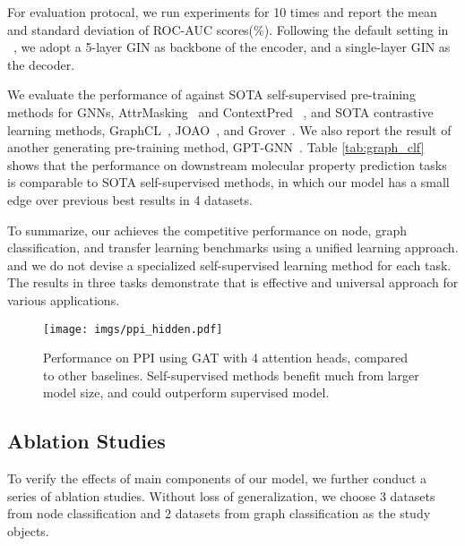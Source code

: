 {For evaluation protocal,  we run experiments for 10 times and report the mean and standard deviation of ROC-AUC scores(\%). Following the default setting in ~\cite{hu2020strategies},  we adopt a 5-layer GIN as backbone of the encoder, and a single-layer GIN as the decoder.


We evaluate the performance of \model against SOTA self-supervised pre-training methods for GNNs, AttrMasking~\cite{hu2020strategies} and ContextPred~\cite{hu2020strategies} , and SOTA contrastive learning methods, GraphCL~\cite{you2020graph}, JOAO~\cite{you2021graph}, and Grover~\cite{rong2020self}. We also report the result of another generating pre-training method, GPT-GNN~\cite{hu2020gpt}. Table \ref{tab:graph_clf} shows that the performance on downstream molecular property prediction tasks is comparable to SOTA self-supervised methods, in which our model has a small edge over previous best results in 4 datasets. 


To summarize, our \model achieves the competitive performance on node, graph classification, and transfer learning benchmarks using a unified learning approach. and we do not devise a specialized self-supervised learning method for each task. The results in three tasks demonstrate that \model is effective and universal approach for various applications. 













\begin{figure}
    \centering
    \texttt{[image: imgs/ppi\_hidden.pdf]}
    \vspace{-4mm}
    \caption{Performance on PPI using GAT with 4 attention heads, compared to other baselines. Self-supervised methods benefit much from larger model size, and \model could outperform supervised model. }
    \label{fig:ppi_hidden}
\end{figure}



\subsection{Ablation Studies}
To verify the effects of main components of our model, we further conduct a series of ablation studies. Without loss of generalization, we choose 3 datasets from node classification and 2 datasets from graph classification as the study objects.



}
